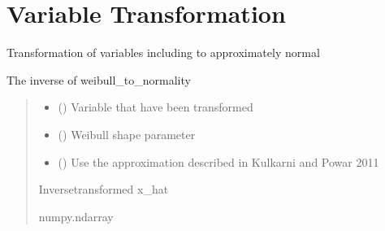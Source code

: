 \documentclass[letterpaper,10pt,english]{sphinxmanual}
\begin{document}
\section{Variable Transformation}
\label{\detokenize{misc:module-glomar_gridding.transformation}}\label{\detokenize{misc:variable-transformation}}
\sphinxAtStartPar
Transformation of variables including to approximately normal

\begin{fulllineitems}
\label{\detokenize{misc:glomar_gridding.transformation.inv_weibull_to_normality}}
\pysigstartsignatures
\pysiglinewithargsret
{}
{\sphinxparamcomma {}\sphinxparamcomma {}}
{}
\pysigstopsignatures
\sphinxAtStartPar
The inverse of weibull\_to\_normality
\begin{quote}\begin{description}
\begin{itemize}
\item {}
\sphinxAtStartPar
{} () \textendash{} Variable that have been transformed

\item {}
\sphinxAtStartPar
{} () \textendash{} Weibull shape parameter

\item {}
\sphinxAtStartPar
{} () \textendash{} Use the approximation described in Kulkarni and Powar 2011

\end{itemize}

\sphinxAtStartPar
{} \textendash{} Inverse\sphinxhyphen{}transformed x\_hat

\sphinxAtStartPar
numpy.ndarray

\end{description}\end{quote}

\end{fulllineitems}
\end{document}
